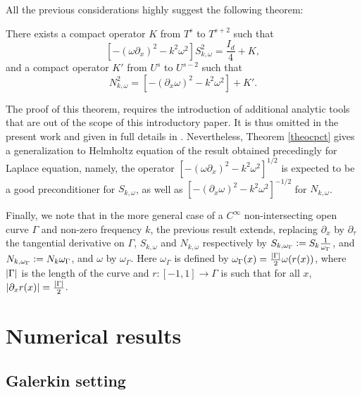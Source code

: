 \documentclass[a4paper]{article}
\begin{document}
All the previous considerations highly suggest the following theorem:	
\begin{theorem} 
\label{theocpct}
	There exists a compact operator $K$ from $T^s$ to $T^{s+2}$ such that
	\[\left[-(\omega \partial_x)^2 - k^2\omega^2\right]S_{k,\omega}^2 = \frac{I_d}{4} + K, \]
	and a compact operator $K'$ from $U^s$ to $U^{s-2}$ such that
	\[N_{k,\omega}^2 = \left[-(\partial_x \omega)^2 - k^2 \omega^2\right] + K'.\]
\end{theorem}
The proof of this theorem, requires the introduction of additional analytic tools that are out of the scope of this introductory paper. 
It is thus omitted in the present work and given in full details in \cite{averseng}. Nevertheless, Theorem \ref{theocpct} gives a generalization
to Helmholtz equation of the result obtained precedingly for Laplace equation, namely, the operator 
$\left[-(\omega \partial_x)^2 - k^2 \omega^2\right]^{1/2}$ is expected to be a good preconditioner for $S_{k,\omega}$, as well as 
$\left[-(\partial_x \omega)^2 - k^2 \omega^2\right]^{-1/2}$ for $N_{k,\omega}$. 

Finally, we note that in the more general case of a $C^{\infty}$ non-intersecting open curve $\Gamma$ and non-zero frequency $k$, the 
previous result extends, replacing $\partial_x$ by $\partial_\tau$ the tangential derivative on $\Gamma$, $S_{k,\omega}$ and $N_{k,\omega}$ respectively by 
$S_{k,\omega_{\Gamma}} \mathrel{\mathop:}= S_k \frac{1}{\omega_\Gamma}$, and $N_{k,\omega_{\Gamma}} \mathrel{\mathop:}= N_k \omega_\Gamma$, and $\omega$ by $\omega_\Gamma$. Here $\omega_\Gamma$ is defined by $\omega_\Gamma(x) = \frac{\left\lvert \Gamma \right\rvert}{2} \omega(r(x))$, where $\left\lvert \Gamma \right\rvert$ is the length of the curve and $r: [-1,1] \to \Gamma$ is such that for all $x$, $\left\lvert \partial_x r(x) \right\rvert = \frac{\left\lvert \Gamma \right\rvert}{2}$.  

\section{Numerical results}
\label{sec:numerMeth}

\subsection{Galerkin setting}
\end{document}

